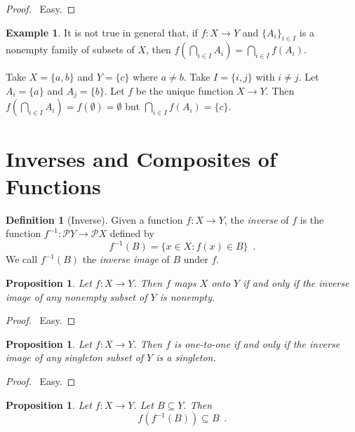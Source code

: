 \documentclass{report}
\let\qed\relax
\newtheorem{prop}[ax]{Proposition}
\theoremstyle{definition}
\newtheorem{df}[ax]{Definition}
\newtheorem{ex}[ax]{Example}
\begin{document}
\begin{proof}
\pf\ Easy. \qed
\end{proof}

\begin{ex}
It is not true in general that, if $f : X \rightarrow Y$ and $\{A_i\}_{i \in I}$ is a nonempty family of subsets of $X$, then $f \left( \bigcap_{i \in I} A_i \right) = \bigcap_{i \in I} f(A_i)$.

Take $X = \{a,b\}$ and $Y = \{c\}$ where $a \neq b$. Take $I = \{i,j\}$ with $i \neq j$. Let $A_i = \{a\}$ and $A_j = \{b\}$. Let $f$ be the unique function $X \rightarrow Y$. Then $f \left( \bigcap_{i \in I} A_i \right) = f(\emptyset) = \emptyset$ but $\bigcap_{i \in I} f(A_i) = \{c\}$.
\end{ex}

\section{Inverses and Composites of Functions}

\begin{df}[Inverse]
Given a function $f : X \rightarrow Y$, the \emph{inverse} of $f$ is the function $f^{-1} : \mathcal{P} Y \rightarrow \mathcal{P} X$ defined by
\[ f^{-1}(B) = \{ x \in X : f(x) \in B \} \enspace . \]
We call $f^{-1}(B)$ the \emph{inverse image} of $B$ under $f$.
\end{df}

\begin{prop}
Let $f : X \rightarrow Y$. Then $f$ maps $X$ onto $Y$ if and only if the inverse image of any nonempty subset of $Y$ is nonempty.
\end{prop}

\begin{proof}
\pf\ Easy. \qed
\end{proof}

\begin{prop}
Let $f : X \rightarrow Y$. Then $f$ is one-to-one if and only if the inverse image of any singleton subset of $Y$ is a singleton.
\end{prop}

\begin{proof}
\pf\ Easy. \qed
\end{proof}

\begin{prop}
Let $f : X \rightarrow Y$. Let $B \subseteq Y$. Then
\[ f(f^{-1}(B)) \subseteq B \enspace . \]
\end{prop}
\end{document}
